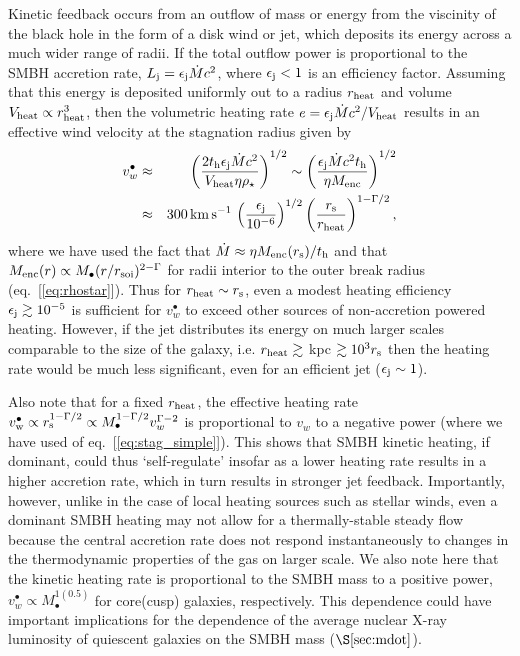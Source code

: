 \documentclass[usenatbib,fleqn]{mn2e}
\begin{document}
Kinetic feedback occurs from an outflow of mass or energy  from the viscinity of the black hole in the form of a disk wind or jet, which deposits its energy across a much wider range of radii.  If the total outflow power is proportional to the SMBH accretion rate, $L_{\rm j} = \epsilon_{\rm j} \dot{M}c^{2}$, where $\epsilon_{\rm j} < 1$ is an efficiency factor.  Assuming that this energy is deposited uniformly out to a radius $r_{\rm heat}$ and volume $V_{\rm heat} \propto r_{\rm heat}^{3}$, then the volumetric heating rate $e = \epsilon_{\rm j}\dot{M}c^{2}/V_{\rm heat}$ results in an effective wind velocity at the stagnation radius given by
\begin{eqnarray} v_{w}^{\bullet} &\approx& \left(\frac{2t_{\rm
h}\epsilon_{\rm j}\dot{M}c^{2}}{V_{\rm heat}\eta
\rho_{\star}}\right)^{1/2} \sim \left(\frac{\epsilon_{\rm
j}\dot{M}c^{2}t_{\rm h}}{\eta M_{\rm enc}}\right)^{1/2} \nonumber \\
&\approx& 300\,{\rm km\,s^{-1}}\,\left(\frac{\epsilon_{\rm j}}{10^{-6}}\right)^{1/2}\left(\frac{r_{\rm s}}{r_{\rm
heat}}\right)^{1-\Gamma/2},
\label{eq:vjet}
\end{eqnarray} where we have used the fact that $\dot{M} \approx \eta
M_{\rm enc}(r_{\rm s})/t_{\rm h}$ and that $M_{\rm enc}(r) \propto
M_{\bullet}(r/r_{\rm soi})^{2-\Gamma}$ for radii interior to the outer
break radius (eq.~[\ref{eq:rhostar}]).  Thus for $r_{\rm heat} \sim
r_{\rm s}$, even a modest heating efficiency $\epsilon_{\rm j} \gtrsim
10^{-5}$ is sufficient for $v_{w}^{\bullet}$ to exceed other
sources of non-accretion powered heating.  However, if the jet distributes its energy on much larger scales comparable to the size of the galaxy, i.e. $r_{\rm heat} \gtrsim $ kpc $\gtrsim 10^{3}r_{\rm s}$ then the heating rate would be much less significant, even for an efficient jet ($\epsilon_{\rm j} \sim 1$).

Also note that for a fixed $r_{\rm heat}$, the effective heating rate $v_{\rm  w}^{\bullet} \propto r_{\rm s}^{1-\Gamma/2} \propto M_{\bullet}^{1-\Gamma/2}v_{w}^{\Gamma-2}$ is proportional to $v_{w}$ to a negative power (where we have used of eq.~[\ref{eq:stag_simple}]).  This shows that SMBH kinetic heating, if dominant, could thus `self-regulate' insofar as a lower heating rate results in a higher accretion rate, which in turn results in stronger jet feedback.  Importantly, however, unlike in the case of local heating sources such as stellar winds, even a dominant SMBH heating may not allow for a thermally-stable steady flow because the central accretion rate does not respond instantaneously to changes in the
thermodynamic properties of the gas on larger scale.  We also note here that the kinetic heating rate is proportional to the SMBH mass to a positive power, $v_{w}^{\bullet} \propto M_{\bullet}^{1(0.5)}$ for core(cusp) galaxies, respectively. This dependence could have important implications for the dependence of the average nuclear X-ray luminosity of quiescent galaxies on the SMBH mass ($\S\ref{sec:mdot}$).
\end{document}

